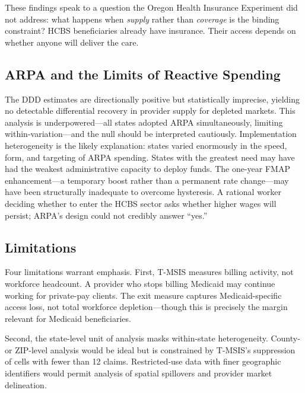 \documentclass[12pt]{article}
\begin{document}
These findings speak to a question the Oregon Health Insurance Experiment \citep{finkelstein2012,baicker2013} did not address: what happens when \emph{supply} rather than \emph{coverage} is the binding constraint? HCBS beneficiaries already have insurance. Their access depends on whether anyone will deliver the care.

\subsection{ARPA and the Limits of Reactive Spending}

The DDD estimates are directionally positive but statistically imprecise, yielding no detectable differential recovery in provider supply for depleted markets. This analysis is underpowered---all states adopted ARPA simultaneously, limiting within-variation---and the null should be interpreted cautiously. Implementation heterogeneity is the likely explanation: states varied enormously in the speed, form, and targeting of ARPA spending. States with the greatest need may have had the weakest administrative capacity to deploy funds. The one-year FMAP enhancement---a temporary boost rather than a permanent rate change---may have been structurally inadequate to overcome hysteresis. A rational worker deciding whether to enter the HCBS sector asks whether higher wages will persist; ARPA's design could not credibly answer ``yes.''

\subsection{Limitations}

Four limitations warrant emphasis. First, T-MSIS measures billing activity, not workforce headcount. A provider who stops billing Medicaid may continue working for private-pay clients. The exit measure captures Medicaid-specific access loss, not total workforce depletion---though this is precisely the margin relevant for Medicaid beneficiaries.

Second, the state-level unit of analysis masks within-state heterogeneity. County- or ZIP-level analysis would be ideal but is constrained by T-MSIS's suppression of cells with fewer than 12 claims. Restricted-use data with finer geographic identifiers would permit analysis of spatial spillovers and provider market delineation.
\end{document}
